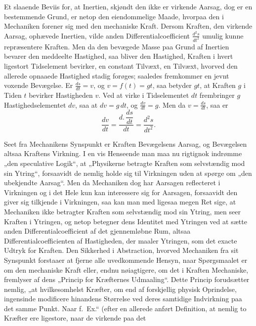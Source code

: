 \documentclass[12pt]{book}
\newcommand{\opage}[1]{\marginnote{\footnotesize\textit{[#1]}}}
\begin{document}
Et slaaende Beviis for, at Inertien, skjøndt den ikke er virkende Aarsag, dog er en
bestemmende Grund, er netop den eiendommelige Maade, hvorpaa den i Mechaniken forener sig
med den mechaniske Kraft. Dersom Kraften, den virkende Aarsag, ophævede Inertien, vilde
anden Differentialcoefficient $\frac{d^{2}s}{dt^{2}}$ umulig kunne repræsentere Kraften.
Men da den bevægede Masse paa Grund af Inertien bevarer den meddeelte Hastighed, saa
bliver den Hastighed, Kraften i hvert ligestort Tidselement bevirker, en constant
Tilvæxt, en Tilvæxt, hvorved
\opage{342} den allerede opnaaede Hastighed stadig forøges; saaledes fremkommer en jevnt voxende
Bevægelse. Er $\frac{ds}{dt} = v$, og $v = f(t) = gt$, saa betyder $gt$, at Kraften $g$ i
Tiden $t$ bevirker Hastigheden $v$. Ved at virke i Tidselementet $dt$ frembringer $g$
Hastighedselementet $dv$, saa at $dv = g\,dt$, og $\frac{dv}{dt} = g$. Men da
$v = \frac{ds}{dt}$, saa er
\[ \frac{dv}{dt} = \frac{d.\,\dfrac{ds}{dt}}{dt} = \frac{d^{2}s}{dt^{2}}. \]

Seet fra Mechanikens Synspunkt er Kraften Bevægelsens Aarsag, og Bevægelsen altsaa
Kraftens Virkning. I en vis Henseende man maa nu rigtignok indrømme „den speculative
Logik“, at „Physikerne betragte Kraften som selvstændig mod sin Ytring“, forsaavidt de
nemlig holde sig til Virkningen uden at spørge om „den ubekjendte Aarsag“. Men da
Mechaniken dog har Aarsagen reflecteret i Virkningen og i det Hele kun kan interessere sig
for Aarsagen, forsaavidt den giver sig tilkjende i Virkningen, saa kan man med ligesaa
megen Ret sige, at Mechaniken ikke betragter Kraften som selvstændig mod sin Ytring, men
seer Kraften i Ytringen, og netop betegner dens Identitet med Ytringen ved at sætte anden
Differentialcoefficient af det gjennemløbne Rum, altsaa Differentialcoefficienten af
Hastigheden, der maaler Ytringen, som det exacte Udtryk for Kraften. Den Sikkerhed i
Abstraction, hvorved Mechaniken fra sit Synspunkt forstaaer at fjerne alle uvedkommende
Hensyn, naar Spørgsmaalet er om den mechaniske Kraft eller, endnu nøiagtigere, om det i
Kraften Mechaniske, fremlyser af dens „Princip for Kræfternes Udmaaling“. Dette Princip
forudsætter nemlig, „at hvilkesomhelst Kræfter, om end af forskjellig physisk Oprindelse,
ingensinde modificere hinandens Størrelse ved deres samtidige Indvirkning paa det samme
Punkt. Naar f.\ Ex.“ (efter en allerede anført Definition, at nemlig to Kræfter ere
ligestore, naar de virkende paa det
\end{document}
